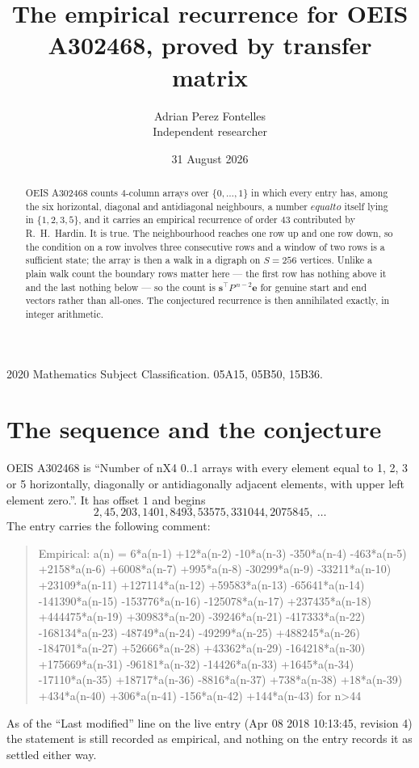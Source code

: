 \documentclass[11pt,a4paper]{article}
\title{The empirical recurrence for OEIS A302468, proved by transfer matrix}
\author{Adrian Perez Fontelles\\ \small Independent researcher}
\date{31 August 2026}
\theoremstyle{plain}
\theoremstyle{definition}
\begin{document}
\maketitle

\begin{abstract}
OEIS A302468 counts $4$-column arrays over $\{0,\dots,1\}$ in which every entry has,
among the six horizontal, diagonal and antidiagonal neighbours, a number $equal to$ itself lying in $\{1,2,3,5\}$, and it carries an empirical
recurrence of order $43$ contributed by R.~H.~Hardin. It is true. The neighbourhood
reaches one row up and one row down, so the condition on a row involves three consecutive
rows and a window of two rows is a sufficient state; the array is then a walk in a digraph
on $S=256$ vertices. Unlike a plain walk count the boundary rows matter here --- the first
row has nothing above it and the last nothing below --- so the count is
$\mathbf{s}^{\!\top}P^{\,n-2}\mathbf{e}$ for genuine start and end vectors rather than
all-ones. The conjectured recurrence is then annihilated exactly, in integer arithmetic.
\end{abstract}

\noindent\small 2020 Mathematics Subject Classification. 05A15, 05B50, 15B36.\normalsize

\section{The sequence and the conjecture}

OEIS A302468 is ``Number of nX4 0..1 arrays with every element equal to 1, 2, 3 or 5 horizontally, diagonally or antidiagonally adjacent elements, with upper left element zero.''. It has offset
$1$ and begins
\[
2, 45, 203, 1401, 8493, 53575, 331044, 2075845,\ \dots
\]
The entry carries the following comment:
\begin{quote}\small
Empirical: a(n) = 6*a(n-1) +12*a(n-2) -10*a(n-3) -350*a(n-4) -463*a(n-5) +2158*a(n-6) +6008*a(n-7) +995*a(n-8) -30299*a(n-9) -33211*a(n-10) +23109*a(n-11) +127114*a(n-12) +59583*a(n-13) -65641*a(n-14) -141390*a(n-15) -153776*a(n-16) -125078*a(n-17) +237435*a(n-18) +444475*a(n-19) +30983*a(n-20) -39246*a(n-21) -417333*a(n-22) -168134*a(n-23) -48749*a(n-24) -49299*a(n-25) +488245*a(n-26) -184701*a(n-27) +52666*a(n-28) +43362*a(n-29) -164218*a(n-30) +175669*a(n-31) -96181*a(n-32) -14426*a(n-33) +1645*a(n-34) -17110*a(n-35) +18717*a(n-36) -8816*a(n-37) +738*a(n-38) +18*a(n-39) +434*a(n-40) +306*a(n-41) -156*a(n-42) +144*a(n-43) for n>44
\end{quote}
As of the ``Last modified'' line on the live entry (Apr 08 2018 10:13:45, revision
4) the statement is still recorded as empirical, and nothing on the entry
records it as settled either way.
\end{document}
